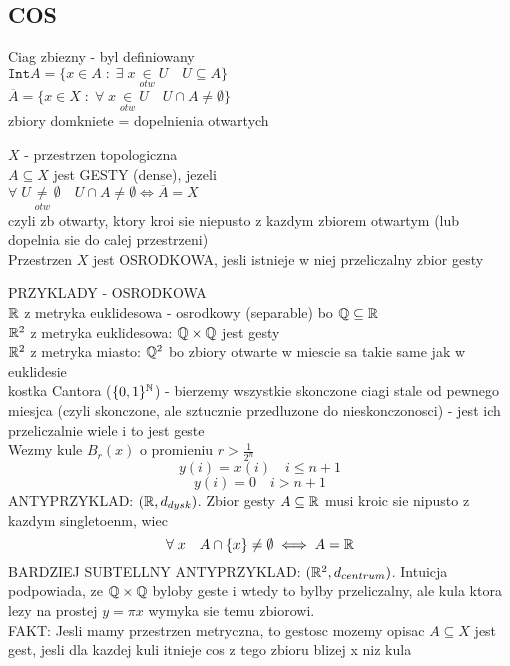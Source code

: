 \documentclass{article}
\begin{document}
\subsection*{COS}
    Ciag zbiezny - byl definiowany\\
    $\texttt{Int}A= \{x\in A\;:\;\exists\;x\underset{otw}\in U\quad U\subseteq A\}$\\
    $\overline{A}=\{x\in X\;:\;\forall\;x\underset{otw}\in U\quad U\cap A\neq \emptyset\}$\\
    zbiory domkniete = dopelnienia otwartych
    \begin{center}
        $X$ - przestrzen topologiczna\medskip\\
        $A\subseteq X$ jest GESTY (dense), jezeli\smallskip\\
        $\forall\; U\underset{otw}\neq\emptyset\quad U\cap A\neq \emptyset\iff \overline{A}=X$\smallskip\\
        czyli zb otwarty, ktory kroi sie niepusto z kazdym zbiorem otwartym (lub dopelnia sie do calej przestrzeni)\bigskip\\
        Przestrzen $X$ jest OSRODKOWA, jesli istnieje w niej przeliczalny zbior gesty
    \end{center}\bigskip
    PRZYKLADY - OSRODKOWA\medskip\\
    $\mathbb{R}$ z metryka euklidesowa - osrodkowy (separable) bo $\mathbb{Q}\subseteq \mathbb{R}$\medskip\\
    $\mathbb{R}^2$ z metryka euklidesowa: $\mathbb{Q}\times \mathbb{Q}$ jest gesty\medskip\\
    $\mathbb{R}^2$ z metryka miasto: $\mathbb{Q}^2$ bo zbiory otwarte w miescie sa takie same jak w euklidesie\medskip\\
    kostka Cantora ($\{0,1\}^{\mathbb{N}}$) - bierzemy wszystkie skonczone ciagi stale od pewnego miesjca (czyli skonczone, ale sztucznie przedluzone do nieskonczonosci) - jest ich przeliczalnie wiele i to jest geste\\
    Wezmy kule $B_r(x)$ o promieniu $r>\frac1{2^n}$
    $$y(i)=x(i)\quad i\leq n+1$$
    $$y(i)=0 \quad i>n+1$$
    ANTYPRZYKLAD: $(\mathbb{R}, d_{dysk})$. Zbior gesty $A\subseteq \mathbb{R}$ musi kroic sie nipusto z kazdym singletoenm, wiec
    $$\forall\;x\quad A\cap \{x\}\neq\emptyset\iff A=\mathbb{R}$$
    BARDZIEJ SUBTELLNY ANTYPRZYKLAD: $(\mathbb{R}^2, d_{centrum})$. Intuicja podpowiada, ze $\mathbb{Q}\times\mathbb{Q}$ byloby geste i wtedy to bylby przeliczalny, ale kula ktora lezy na prostej $y=\pi x$ wymyka sie temu zbiorowi.\\
    FAKT: Jesli mamy przestrzen metryczna, to gestosc mozemy opisac $A\subseteq X$ jest gest, jesli dla kazdej kuli itnieje cos z tego zbioru blizej x niz kula
\end{document}
